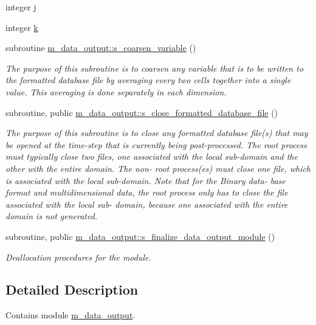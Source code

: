 \begin{DoxyCompactItemize}
\item 
integer \hyperlink{m__data__output_8f90_aeadbc0ce9b66517f8fde156199772ec1}{j}
\item 
integer \hyperlink{m__data__output_8f90_af22c486581933c52df7d4aa306382074}{k}
\item 
subroutine \hyperlink{namespacem__data__output_ae32f7bdb38c6c216a819fb0b3a7e06cd}{m\+\_\+data\+\_\+output\+::s\+\_\+coarsen\+\_\+variable} ()
\begin{DoxyCompactList}\small\item\em The purpose of this subroutine is to coarsen any variable that is to be written to the formatted database file by averaging every two cells together into a single value. This averaging is done separately in each dimension. \end{DoxyCompactList}\item 
subroutine, public \hyperlink{namespacem__data__output_a9ab4e5bfbf085c126a58c78383d38fa7}{m\+\_\+data\+\_\+output\+::s\+\_\+close\+\_\+formatted\+\_\+database\+\_\+file} ()
\begin{DoxyCompactList}\small\item\em The purpose of this subroutine is to close any formatted database file(s) that may be opened at the time-\/step that is currently being post-\/processed. The root process must typically close two files, one associated with the local sub-\/domain and the other with the entire domain. The non-\/ root process(es) must close one file, which is associated with the local sub-\/domain. Note that for the Binary data-\/ base format and multidimensional data, the root process only has to close the file associated with the local sub-\/ domain, because one associated with the entire domain is not generated. \end{DoxyCompactList}\item 
subroutine, public \hyperlink{namespacem__data__output_a02f2b04a434c1f0ebf9156147d0f976e}{m\+\_\+data\+\_\+output\+::s\+\_\+finalize\+\_\+data\+\_\+output\+\_\+module} ()
\begin{DoxyCompactList}\small\item\em Deallocation procedures for the module. \end{DoxyCompactList}\end{DoxyCompactItemize}


\subsection{Detailed Description}
Contains module \hyperlink{namespacem__data__output}{m\+\_\+data\+\_\+output}. 

